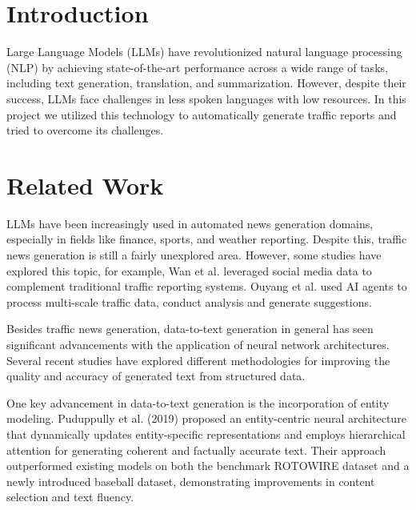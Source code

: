\documentclass[fleqn,moreauthors,10pt]{ds_report}
\affiliation{\textit{Advisors: Slavko Žitnik}}
\begin{document}
\flushbottom 

\maketitle 

\thispagestyle{empty} 


\section*{Introduction}

Large Language Models (LLMs) have revolutionized natural language processing (NLP) by achieving state-of-the-art performance across a wide range of tasks, including text generation, translation, and summarization. However, despite their success, LLMs face challenges in less spoken languages with low resources. In this project we utilized this technology to automatically generate traffic reports and tried to overcome its challenges. 

\section*{Related Work}

LLMs have been increasingly used in automated news generation domains, especially in fields like finance, sports, and weather reporting. Despite this, traffic news generation is still a fairly unexplored area. However, some studies have explored this topic, for example, Wan et al. \cite{wan2020empoweringrealtimetraffic} leveraged social media data to complement traditional traffic reporting systems. Ouyang et al. \cite{ouyang2024trafficgptmultiscaletrafficanalysis} used AI agents to process multi-scale traffic data, conduct analysis and generate suggestions.

Besides traffic news generation, data-to-text generation in general has seen significant advancements with the application of neural network architectures. Several recent studies have explored different methodologies for improving the quality and accuracy of generated text from structured data.

One key advancement in data-to-text generation is the incorporation of entity modeling. Puduppully et al. (2019) \cite{puduppully2019datatotextgenerationentitymodeling} proposed an entity-centric neural architecture that dynamically updates entity-specific representations and employs hierarchical attention for generating coherent and factually accurate text. Their approach outperformed existing models on both the benchmark ROTOWIRE dataset and a newly introduced baseball dataset, demonstrating improvements in content selection and text fluency.
\end{document}
